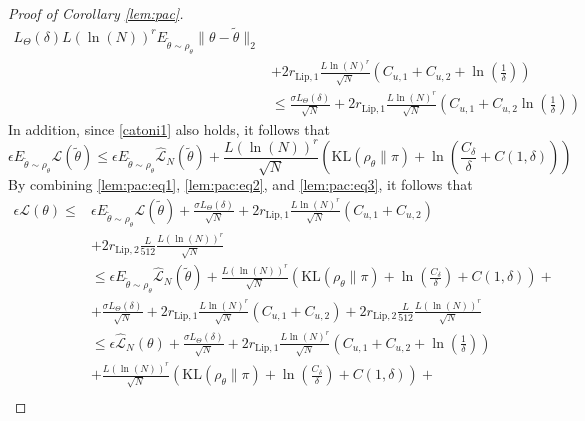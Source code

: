 \documentclass{article}
\newcommand{\KL}{\mathrm{KL}}
\renewcommand{\KL}{\mathrm{KL}}
\begin{document}
\begin{proof}[Proof of Corollary \ref{lem:pac}]
\begin{equation}
\begin{aligned}
     L_{\Theta}(\delta) L(\ln(N))^r E_{\tilde{\theta} \sim \rho_{\theta}}\|\theta - \tilde{\theta}\|_2 \\
          & + 2r_{\text{Lip},1}\frac{L\ln(N)^{r}}{\sqrt{N}}\left(C_{u,1} + C_{u,2}+\ln\left(\frac{1}{\delta}\right)\right) \\
          & \le \frac{\sigma L_{\Theta}(\delta)}{\sqrt{N}}+2r_{\text{Lip},1}\frac{L\ln(N)^{r}}{\sqrt{N}}\left(C_{u,1} + C_{u,2}
          \ln\left(\frac{1}{\delta}\right)
          \right)
\end{aligned}
\end{equation}
In addition, since \eqref{catoni1} also holds, it follows that
\begin{equation}
  \label{lem:pac:eq3}
    \epsilon E_{\tilde{\theta} \sim \rho_{\theta}}\mathcal{L}(\tilde{\theta}) \le \epsilon E_{\tilde{\theta} \sim \rho_{\theta}}\hat{\mathcal{L}}_N(\tilde{\theta}) + \frac{L (\ln(N))^r}{\sqrt{N}} \left( \KL(\rho_{\theta} \| \pi) + \ln\left(\frac{C_{\delta}}{\delta}+C(1,\delta)\right) \right)
\end{equation}
By combining \eqref{lem:pac:eq1}, \eqref{lem:pac:eq2}, and \eqref{lem:pac:eq3}, it follows that
\begin{align*}
   \epsilon \mathcal{L}(\theta) \le & \epsilon E_{\tilde{\theta} \sim \rho_{\theta}}\mathcal{L}(\tilde{\theta}) + \frac{\sigma L_{\Theta}(\delta)}{\sqrt{N}}+2r_{\text{Lip},1}\frac{L\ln(N)^{r}}{\sqrt{N}}\left(C_{u,1} + C_{u,2}\right)  \\
          & + 2r_{\text{Lip},2}  \frac{L}{512} \frac{L(\ln(N))^r}{\sqrt{N}} \\
          & \le \epsilon E_{\tilde{\theta} \sim \rho_{\theta}}\hat{\mathcal{L}}_N(\tilde{\theta}) + \frac{L (\ln(N))^r}{\sqrt{N}} \left( \KL(\rho_{\theta} \| \pi) + \ln\left(\frac{C_{\delta}}{\delta}\right)+C(1,\delta)\right) + \\
          & + \frac{\sigma L_{\Theta}(\delta)}{\sqrt{N}}+2r_{\text{Lip},1}\frac{L\ln(N)^{r}}{\sqrt{N}}\left(C_{u,1} + C_{u,2}\right) + 2r_{\text{Lip},2}  \frac{L}{512} \frac{L(\ln(N))^r}{\sqrt{N}} \\
          & \le \epsilon \hat{\mathcal{L}}_N(\theta) + 
\frac{\sigma L_{\Theta}(\delta)}{\sqrt{N}}
           +  2r_{\text{Lip},1}\frac{L\ln(N)^{r}}{\sqrt{N}}\left(C_{u,1} + C_{u,2}+\ln\left(\frac{1}{\delta}\right)\right) \\
           & + \frac{L (\ln(N))^r}{\sqrt{N}} \left( \KL(\rho_{\theta} \| \pi) + \ln\left(\frac{C_{\delta}}{\delta}\right)+C(1,\delta) \right) + \\

\end{align*}
\end{proof}
\end{document}
